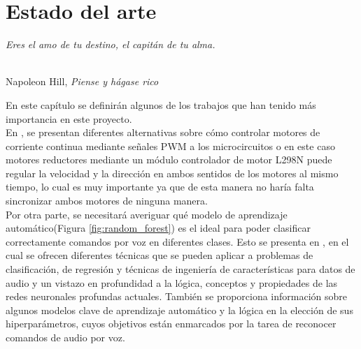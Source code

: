 \chapter{Estado del arte}
\label{cap:capitulo2}
\setcounter{page}{1}

\begin{flushright}
\begin{minipage}[]{10cm}
\emph{Eres el amo de tu destino, el capitán de tu alma.}\\
\end{minipage}\\

Napoleon Hill, \textit{Piense y hágase rico}\\
\end{flushright}

\vspace{1cm}

En este capítulo se definirán algunos de los trabajos que han tenido más importancia en este proyecto.\\

En \cite{9815716}, se presentan diferentes alternativas sobre cómo controlar motores de corriente continua mediante señales PWM a los microcircuitos o en este caso motores reductores mediante un módulo controlador de motor L298N puede regular la velocidad y la dirección en ambos sentidos de los motores al mismo tiempo, lo cual es muy importante ya que de esta manera no haría falta sincronizar ambos motores de ninguna manera.\\

Por otra parte, se necesitará averiguar qué modelo de aprendizaje automático(Figura \ref{fig:random_forest}) es el ideal para poder clasificar correctamente comandos por voz en diferentes clases. Esto se presenta en \cite{Zenkov-sklearn-SER-basics}, en el cual se ofrecen diferentes técnicas que se pueden aplicar a problemas de clasificación, de regresión y técnicas de ingeniería de características para datos de audio y un vistazo en profundidad a la lógica, conceptos y propiedades de las redes neuronales profundas actuales. También se proporciona información sobre algunos modelos clave de aprendizaje automático y la lógica en la elección de sus hiperparámetros, cuyos objetivos están enmarcados por la tarea de reconocer comandos de audio por voz.\\

